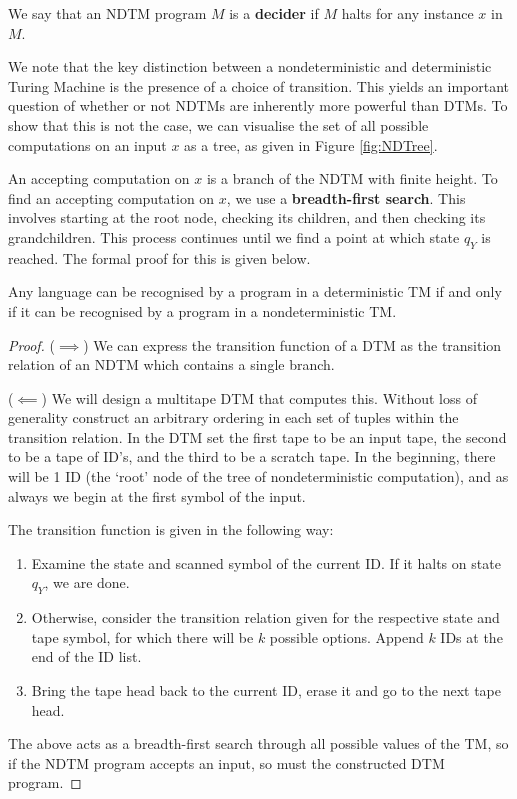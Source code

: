 \begin{definition}
    We say that an NDTM program $M$ is a \textbf{decider} if $M$ halts for any instance $x$ in $M$.
\end{definition}

We note that the key distinction between a nondeterministic and deterministic Turing Machine is the presence of a choice of transition. This yields an important question of whether or not NDTMs are inherently more powerful than DTMs. To show that this is not the case, we can visualise the set of all possible computations on an input $x$ as a tree, as given in Figure \ref{fig:NDTree}.



An accepting computation on $x$ is a branch of the NDTM with finite height. To find an accepting computation on $x$, we use a \textbf{breadth-first search}. This involves starting at the root node, checking its children, and then checking its grandchildren. This process continues until we find a point at which state $q_Y$ is reached. The formal proof for this is given below.

\newpage

\begin{theorem}\label{thm: NDTM DTM equality}
    Any language can be recognised by a program in a deterministic TM if and only if it can be recognised by a program in a nondeterministic TM.
\end{theorem}
\begin{proof}
    ($\implies$) We can express the transition function of a DTM as the transition relation of an NDTM which contains a single branch.

    ($\impliedby$) We will design a multitape DTM that computes this. Without loss of generality construct an arbitrary ordering in each set of tuples within the transition relation. In the DTM set the first tape to be an input tape, the second to be a tape of ID's, and the third to be a scratch tape. In the beginning, there will be 1 ID (the `root' node of the tree of nondeterministic computation), and as always we begin at the first symbol of the input.

    The transition function is given in the following way:

    \begin{enumerate}
        \item Examine the state and scanned symbol of the current ID. If it halts on state $q_Y$, we are done.
        \item Otherwise, consider the transition relation given for the respective state and tape symbol, for which there will be $k$ possible options. Append $k$ IDs at the end of the ID list.
        \item Bring the tape head back to the current ID, erase it and go to the next tape head.
    \end{enumerate}

    The above acts as a breadth-first search through all possible values of the TM, so if the NDTM program accepts an input, so must the constructed DTM program.
\end{proof}